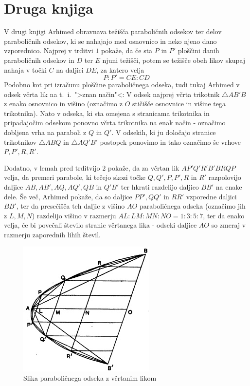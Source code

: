 \documentclass[a4paper, 10pt]{article}
\begin{document}
	\section{Druga knjiga}
		V drugi knjigi Arhimed obravnava težišča paraboličnih odsekov ter delov paraboličnih odsekov, ki se nahajajo med osnovnico in neko njeno dano vzporednico.
		Najprej v trditvi $1$ pokaže, da če sta $P$ in $P'$ ploščini danih paraboličnih odsekov in $D$ ter $E$ njuni težišči, potem se težišče obeh likov skupaj nahaja v točki $C$ na daljici $DE$, za katero velja $$P:P' = CE:CD $$
		Podobno kot pri izračunu ploščine paraboličnega odseka, tudi tukaj Arhimed v odsek včrta lik na t.~i.~">znan način"<: V odsek najprej včrta trikotnik $\triangle AB'B$ z enako osnovnico in višino (označimo z $O$ stičišče osnovnice in višine tega trikotnika). Nato v odseka, ki sta omejena s stranicama trikotnika in pripadajočim odsekom ponovno včrta trikotnika na enak način - označimo dobljena vrha na paraboli z $Q$ in $Q'$. V odsekih, ki ju določajo stranice trikotnikov $\triangle ABQ$ in $\triangle AQ'B'$ postopek ponovimo in tako označimo še vrhove $P, P', R, R'$.
		
		Dodatno, v lemah pred trditvijo $2$ pokaže, da za včrtan lik $AP'Q'R'B'BRQP$ velja, da premeri parabole, ki tečejo skozi točke $Q, Q', P, P', R$ in $R'$ razpolovijo daljice $AB, AB', AQ, AQ', QB$ in $Q'B'$ ter hkrati razdelijo daljico $BB'$ na enake dele. Še več, Arhimed pokaže, da so daljice $PP', QQ'$ in $RR'$ vzporedne daljici $BB'$, ter da presečišča teh daljic z višino $AO$ paraboličnega odseka (označimo jih z $L, M, N$) razdelijo višino v razmerju $AL:LM:MN:NO = 1:3:5:7$, ter da enako velja, če bi povečali število stranic včrtanega lika - odseki daljice $AO$ so zmeraj v razmerju zaporednih lihih števil. 
		\begin{figure}[h!]
			\centering
			\includegraphics[scale=0.75]{Parabol.jpg}
			\caption{Slika paraboličnega odseka z včrtanim likom}
		\end{figure}
		
\end{document}
